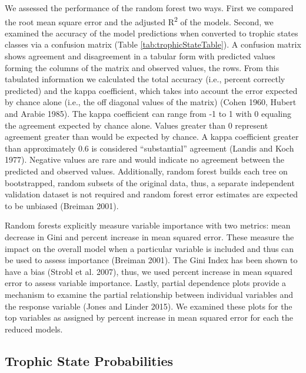 \documentclass[12pt,]{article}
\begin{document}
We assessed the performance of the random forest two ways. First we
compared the root mean square error and the adjusted
R\textsuperscript{2} of the models. Second, we examined the accuracy of
the model predictions when converted to trophic states classes via a
confusion matrix (Table \ref{tab:trophicStateTable}). A confusion matrix
shows agreement and disagreement in a tabular form with predicted values
forming the columns of the matrix and observed values, the rows. From
this tabulated information we calculated the total accuracy (i.e.,
percent correctly predicted) and the kappa coefficient, which takes into
account the error expected by chance alone (i.e., the off diagonal
values of the matrix) (Cohen 1960, Hubert and Arabie 1985). The kappa
coefficient can range from -1 to 1 with 0 equaling the agreement
expected by chance alone. Values greater than 0 represent agreement
greater than would be expected by chance. A kappa coefficient greater
than approximately 0.6 is considered ``substantial'' agreement (Landis
and Koch 1977). Negative values are rare and would indicate no agreement
between the predicted and observed values. Additionally, random forest
builds each tree on bootstrapped, random subsets of the original data,
thus, a separate independent validation dataset is not required and
random forest error estimates are expected to be unbiased (Breiman
2001).

Random forests explicitly measure variable importance with two metrics:
mean decrease in Gini and percent increase in mean squared error. These
measure the impact on the overall model when a particular variable is
included and thus can be used to assess importance (Breiman 2001). The
Gini Index has been shown to have a bias (Strobl et al. 2007), thus, we
used percent increase in mean squared error to assess variable
importance. Lastly, partial dependence plots provide a mechanism to
examine the partial relationship between individual variables and the
response variable (Jones and Linder 2015). We examined these plots for
the top variables as assigned by percent increase in mean squared error
for each the reduced models.

\subsection{Trophic State
Probabilities}\label{trophic-state-probabilities}
\end{document}
